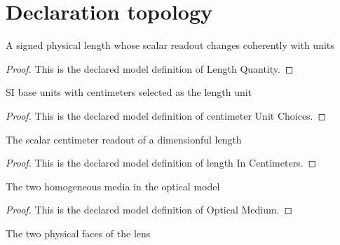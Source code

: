 \section{Declaration topology}
\begin{definition}
  \label{def:physics:phyx-mini-0065:phyxminiproblems-problemphyxmini0065-lengthquantity}
  A signed physical length whose scalar readout changes coherently with units
\end{definition}
\begin{proof}
  This is the declared model definition of Length Quantity.
\end{proof}
\begin{definition}
  \label{def:physics:phyx-mini-0065:phyxminiproblems-problemphyxmini0065-centimeterunitchoices}
  SI base units with centimeters selected as the length unit
\end{definition}
\begin{proof}
  This is the declared model definition of centimeter Unit Choices.
\end{proof}
\begin{definition}
  \label{def:physics:phyx-mini-0065:phyxminiproblems-problemphyxmini0065-lengthincentimeters}
  The scalar centimeter readout of a dimensionful length
\end{definition}
\begin{proof}
  This is the declared model definition of length In Centimeters.
\end{proof}
\begin{definition}
  \label{def:physics:phyx-mini-0065:phyxminiproblems-problemphyxmini0065-opticalmedium}
  The two homogeneous media in the optical model
\end{definition}
\begin{proof}
  This is the declared model definition of Optical Medium.
\end{proof}
\begin{definition}
  \label{def:physics:phyx-mini-0065:phyxminiproblems-problemphyxmini0065-lensface}
  The two physical faces of the lens
\end{definition}
